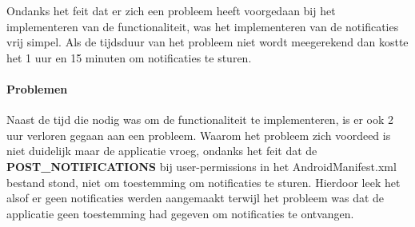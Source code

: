 Ondanks het feit dat er zich een probleem heeft voorgedaan bij het implementeren van de functionaliteit, was 
het implementeren van de notificaties vrij simpel. Als de tijdsduur van het probleem niet wordt meegerekend 
dan kostte het 1 uur en 15 minuten om notificaties te sturen.

\paragraph{Problemen}
Naast de tijd die nodig was om de functionaliteit te implementeren, is er ook 2 uur verloren gegaan aan een probleem. 
Waarom het probleem zich voordeed is niet duidelijk maar de applicatie vroeg, ondanks het feit dat de 
\textbf{POST\_NOTIFICATIONS} bij user-permissions in het AndroidManifest.xml bestand stond, 
niet om toestemming om notificaties te sturen. Hierdoor leek het alsof er geen notificaties werden aangemaakt
terwijl het probleem was dat de applicatie geen toestemming had gegeven om notificaties te ontvangen.